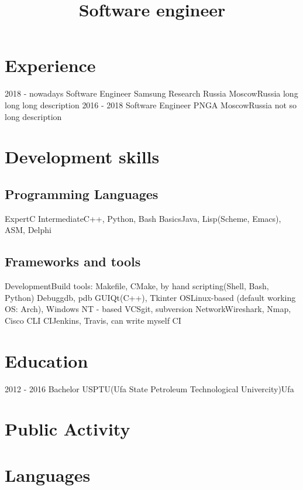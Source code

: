 \documentclass[11pt,a4paper]{moderncv}
\title{Software engineer}
\begin{document}
\makecvtitle

\section{\textbf{Experience}}
\cventry
    {2018 - nowadays}
    {Software Engineer}
    {Samsung Research Russia}
    {Moscow}{Russia}
    {long long long description}
\cventry
    {2016 - 2018}
    {Software Engineer}
    {PNGA}
    {Moscow}{Russia}
    {not so long description}

\section{\textbf{Development skills}}
\subsection{\textbf{Programming Languages}}
\cvitem
    {Expert}{C}
\cvitem
    {Intermediate}{C++, Python, Bash}
\cvitem
    {Basics}{Java, Lisp(Scheme, Emacs), ASM, Delphi}
    
\subsection{\textbf{Frameworks and tools}}
\cvitem
    {Development}{Build tools: Makefile, CMake, by hand scripting(Shell, Bash, Python)}
\cvitem
    {Debug}{gdb, pdb}
\cvitem
    {GUI}{Qt(C++), Tkinter}
\cvitem
    {OS}{Linux-based (default working OS: Arch), Windows NT - based}
\cvitem
    {VCS}{git, subversion}
\cvitem
    {Network}{Wireshark, Nmap, Cisco CLI}
\cvitem
    {CI}{Jenkins, Travis, can write myself CI}
    
\section{\textbf{Education}}
\cventry
    {2012 - 2016}
    {Bachelor}
    {USPTU(Ufa State Petroleum Technological Univercity)}{Ufa}{}{}
    
\section{\textbf{Public Activity}}

\section{\textbf{Languages}}
\end{document}
